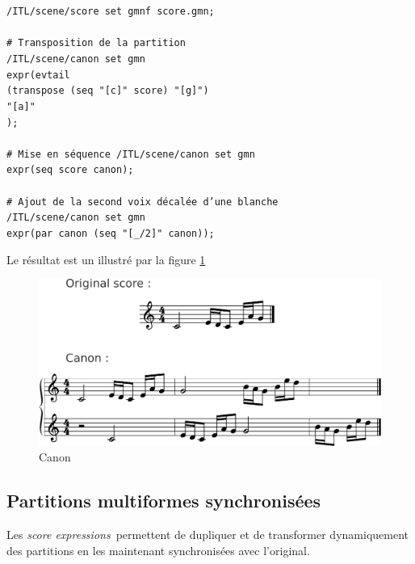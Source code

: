 \documentclass{article}
\newcommand{\sExprs}{\emph{score expressions}}
\newcommand{\tab}{\hspace*{4mm}}
\newcommand{\sample}	[1]			{\vspace{-0.2em}\begin{center}\colorbox{mygrey}{\begin{minipage}[t]{0.97\columnwidth} {\small \texttt{#1}}\end{minipage}}\end{center}}
\begin{document}
\sample{/ITL/scene/score set gmnf score.gmn;\\
\\
\# Transposition de la partition\\
/ITL/scene/canon set gmn\\
\tab expr(evtail\\
\tab\tab(transpose (seq "[c]" score) "[g]")\\
\tab\tab"[a]"\\
\tab);\\
\\
\# Mise en séquence
/ITL/scene/canon set gmn\\
\tab expr(seq score canon);\\
\\
\# Ajout de la second voix décalée d'une blanche\\
/ITL/scene/canon set gmn\\
\tab expr(par canon (seq "[\_/2]" canon));
}
Le résultat est un illustré par la figure \ref{fig:canonFig}
\begin{figure}[th]
\centering
\includegraphics[width=1.\columnwidth]{imgs/exampleCanon}
\caption{Canon
\label{fig:canonFig}}
\end{figure}

\subsection{Partitions multiformes synchronisées}
\label{sample2}

Les \sExprs\ permettent de dupliquer et de transformer dynamiquement des partitions en les maintenant synchronisées avec l'original.
\end{document}
